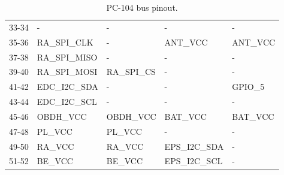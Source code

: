 \begin{table}[!ht]
\begin{tabular}{cllll}
        33-34              & -                & -                & -               & -                \\
        35-36              & RA\_SPI\_CLK     & -                & ANT\_VCC        & ANT\_VCC         \\
        37-38              & RA\_SPI\_MISO    & -                & -               & -                \\
        39-40              & RA\_SPI\_MOSI    & RA\_SPI\_CS      & -               & -                \\
        41-42              & EDC\_I2C\_SDA    & -                & -               & GPIO\_5          \\
        43-44              & EDC\_I2C\_SCL    & -                & -               & -                \\
        45-46              & OBDH\_VCC        & OBDH\_VCC        & BAT\_VCC        & BAT\_VCC         \\
        47-48              & PL\_VCC          & PL\_VCC          & -               & -                \\
        49-50              & RA\_VCC          & RA\_VCC          & EPS\_I2C\_SDA   & -                \\
        51-52              & BE\_VCC          & BE\_VCC          & EPS\_I2C\_SCL   & -                \\
        \bottomrule[1.5pt]
    \end{tabular}
    \caption{PC-104 bus pinout.}
    \label{tab:pc104-pinout}
\end{table}

